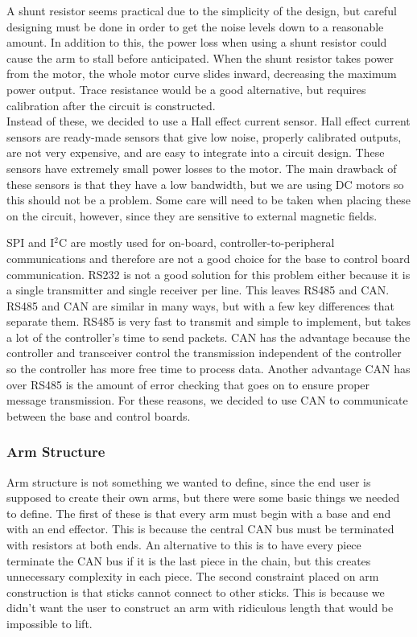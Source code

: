 A shunt resistor seems practical due to the simplicity of the design, but careful designing must be done in order to get the noise levels down to a reasonable amount. In addition to this, the power loss when using a shunt resistor could cause the arm to stall before anticipated. When the shunt resistor takes power from the motor, the whole motor curve slides inward, decreasing the maximum power output. Trace resistance would be a good alternative, but requires calibration after the circuit is constructed. \\
\newline
Instead of these, we decided to use a Hall effect current sensor. Hall effect current sensors are ready-made sensors that give low noise, properly calibrated outputs, are not very expensive, and are easy to integrate into a circuit design. These sensors have extremely small power losses to the motor. The main drawback of these sensors is that they have a low bandwidth, but we are using DC motors so this should not be a problem. Some care will need to be taken when placing these on the circuit, however, since they are sensitive to external magnetic fields.

SPI and I$^2$C are mostly used for on-board, controller-to-peripheral communications and therefore are not a good choice for the base to control board communication. RS232 is not a good solution for this problem either because it is a single transmitter and single receiver per line. This leaves RS485 and CAN. \\
\newline
RS485 and CAN are similar in many ways, but with a few key differences that separate them. RS485 is very fast to transmit and simple to implement, but takes a lot of the controller's time to send packets. CAN has the advantage because the controller and transceiver control the transmission independent of the controller so the controller has more free time to process data. Another advantage CAN has over RS485 is the amount of error checking that goes on to ensure proper message transmission. For these reasons, we decided to use CAN to communicate between the base and control boards.

\subsubsection{Arm Structure}
Arm structure is not something we wanted to define, since the end user is supposed to create their own arms, but there were some basic things we needed to define. The first of these is that every arm must begin with a base and end with an end effector. This is because the central CAN bus must be terminated with resistors at both ends. An alternative to this is to have every piece terminate the CAN bus if it is the last piece in the chain, but this creates unnecessary complexity in each piece. The second constraint placed on arm construction is that sticks cannot connect to other sticks. This is because we didn't want the user to construct an arm with ridiculous length that would be impossible to lift.

